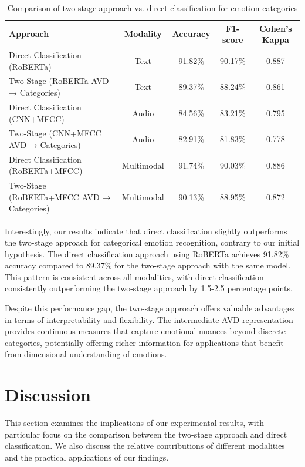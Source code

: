 \documentclass[12pt]{article}
\begin{document}
\begin{table}[h]
\centering
\caption{Comparison of two-stage approach vs. direct classification for emotion categories}
\label{tab:categorical_mapping}
\begin{tabular}{|l|c|c|c|c|}
\hline
\textbf{Approach} & \textbf{Modality} & \textbf{Accuracy} & \textbf{F1-score} & \textbf{Cohen's Kappa} \\
\hline
Direct Classification (RoBERTa) & Text & 91.82\% & 90.17\% & 0.887 \\
\hline
Two-Stage (RoBERTa AVD → Categories) & Text & 89.37\% & 88.24\% & 0.861 \\
\hline
Direct Classification (CNN+MFCC) & Audio & 84.56\% & 83.21\% & 0.795 \\
\hline
Two-Stage (CNN+MFCC AVD → Categories) & Audio & 82.91\% & 81.83\% & 0.778 \\
\hline
Direct Classification (RoBERTa+MFCC) & Multimodal & 91.74\% & 90.03\% & 0.886 \\
\hline
Two-Stage (RoBERTa+MFCC AVD → Categories) & Multimodal & 90.13\% & 88.95\% & 0.872 \\
\hline
\end{tabular}
\end{table}

Interestingly, our results indicate that direct classification slightly outperforms the two-stage approach for categorical emotion recognition, contrary to our initial hypothesis. The direct classification approach using RoBERTa achieves 91.82\% accuracy compared to 89.37\% for the two-stage approach with the same model. This pattern is consistent across all modalities, with direct classification consistently outperforming the two-stage approach by 1.5-2.5 percentage points.

Despite this performance gap, the two-stage approach offers valuable advantages in terms of interpretability and flexibility. The intermediate AVD representation provides continuous measures that capture emotional nuances beyond discrete categories, potentially offering richer information for applications that benefit from dimensional understanding of emotions.

\section{Discussion}
\label{sec:discussion}

This section examines the implications of our experimental results, with particular focus on the comparison between the two-stage approach and direct classification. We also discuss the relative contributions of different modalities and the practical applications of our findings.
\end{document}
